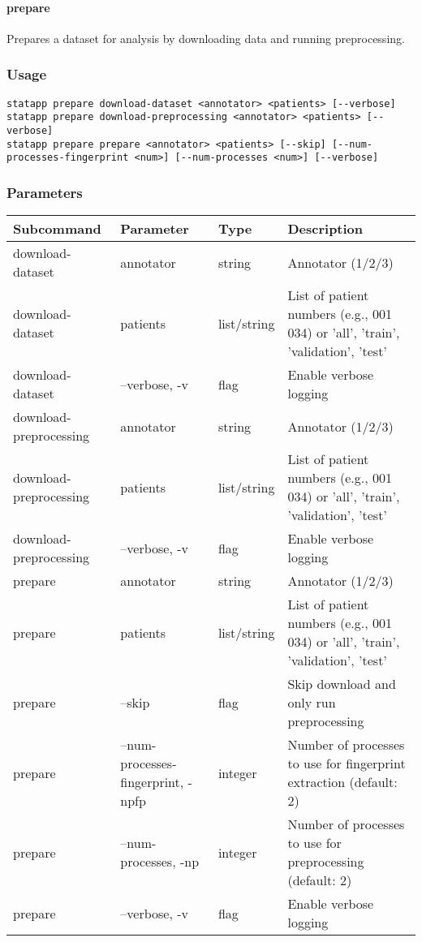 \documentclass{article}
\begin{document}
\paragraph{prepare}
Prepares a dataset for analysis by downloading data and running preprocessing.

\subsubsection{Usage}
\begin{lstlisting}
statapp prepare download-dataset <annotator> <patients> [--verbose]
statapp prepare download-preprocessing <annotator> <patients> [--verbose]
statapp prepare prepare <annotator> <patients> [--skip] [--num-processes-fingerprint <num>] [--num-processes <num>] [--verbose]
\end{lstlisting}

\subsubsection{Parameters}
\begin{tabulary}{\linewidth}{LLLL}
\toprule
\textbf{Subcommand} & \textbf{Parameter} & \textbf{Type} & \textbf{Description} \\
\midrule
download-dataset & annotator & string & Annotator (1/2/3) \\
download-dataset & patients & list/string & List of patient numbers (e.g., 001 034) or 'all', 'train', 'validation', 'test' \\
download-dataset & --verbose, -v & flag & Enable verbose logging \\
\midrule
download-preprocessing & annotator & string & Annotator (1/2/3) \\
download-preprocessing & patients & list/string & List of patient numbers (e.g., 001 034) or 'all', 'train', 'validation', 'test' \\
download-preprocessing & --verbose, -v & flag & Enable verbose logging \\
\midrule
prepare & annotator & string & Annotator (1/2/3) \\
prepare & patients & list/string & List of patient numbers (e.g., 001 034) or 'all', 'train', 'validation', 'test' \\
prepare & --skip & flag & Skip download and only run preprocessing \\
prepare & --num-processes-fingerprint, -npfp & integer & Number of processes to use for fingerprint extraction (default: 2) \\
prepare & --num-processes, -np & integer & Number of processes to use for preprocessing (default: 2) \\
prepare & --verbose, -v & flag & Enable verbose logging \\
\bottomrule
\end{tabulary}
\end{document}
